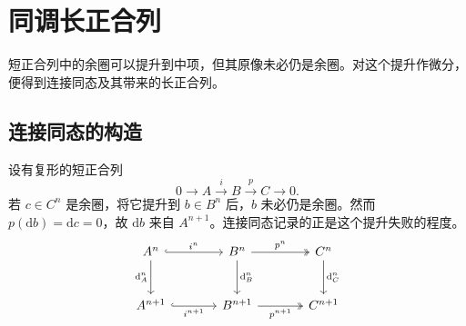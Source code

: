 
\section{同调长正合列}
\label{b4:sec:0503}

短正合列中的余圈可以提升到中项，但其原像未必仍是余圈。对这个提升作微分，便得到连接同态及其带来的长正合列。

%
%

\subsection{连接同态的构造}
\label{b4:subsec:0503:01}

设有复形的短正合列
\[
0\longrightarrow A\xrightarrow{i}B\xrightarrow{p}C\longrightarrow0.
\]
若 \(c\in C^n\) 是余圈，将它提升到 \(b\in B^n\) 后，\(b\) 未必仍是余圈。然而 \(p(\mathrm{d}b)=\mathrm{d}c=0\)，故 \(\mathrm{d}b\) 来自 \(A^{n+1}\)。连接同态记录的正是这个提升失败的程度。
\[
\begin{tikzcd}[column sep=large,row sep=large]
A^n\arrow[r,hook,"i^n"]\arrow[d,"\mathrm{d}_A^n"']&B^n\arrow[r,two heads,"p^n"]\arrow[d,"\mathrm{d}_B^n"]&C^n\arrow[d,"\mathrm{d}_C^n"]\\
A^{n+1}\arrow[r,hook,"i^{n+1}"']&B^{n+1}\arrow[r,two heads,"p^{n+1}"']&C^{n+1}
\end{tikzcd}
\]

